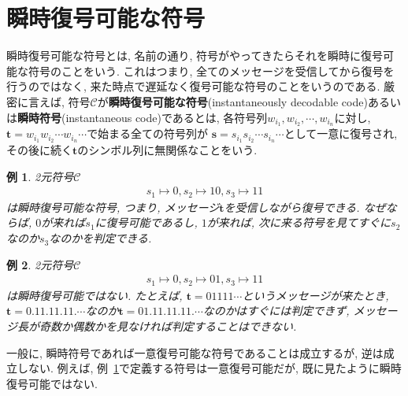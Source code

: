 \documentclass[12pt]{ltjsarticle}
\newcommand*{\exref}[1]{例~\ref{#1}}
\newtheorem{example}{例}
\begin{document}
\section{瞬時復号可能な符号}
瞬時復号可能な符号とは, 名前の通り, 符号がやってきたらそれを瞬時に復号可能な符号のことをいう.
これはつまり, 全てのメッセージを受信してから復号を行うのではなく, 来た時点で遅延なく復号可能な符号のことをいうのである.
厳密に言えば, 符号$\mathcal{C}$が\textbf{瞬時復号可能な符号}(instantaneously decodable code)あるいは\textbf{瞬時符号}(instantaneous code)であるとは,
各符号列$w_{i_1}, w_{i_2}, \cdots, w_{i_n}$に対し,
$\boldsymbol{t} = w_{i_1} w_{i_2} \cdots w_{i_n} \cdots$で始まる全ての符号列が
$\boldsymbol{s} = s_{i_1} s_{i_2} \cdots s_{i_n} \cdots$として一意に復号され,
その後に続く$\boldsymbol{t}$のシンボル列に無関係なことをいう.
\begin{example} \label{ex:not-uniquely}
  2元符号$\mathcal{C}$
  \begin{align*}
    s_1 \mapsto 0, s_2 \mapsto 10, s_3 \mapsto 11
  \end{align*}
  は瞬時復号可能な符号, つまり, メッセージ$\boldsymbol{t}$を受信しながら復号できる.
  なぜならば, $0$が来れば$s_1$に復号可能であるし, $1$が来れば, 次に来る符号を見てすぐに$s_2$なのか$s_3$なのかを判定できる.
\end{example}
\begin{example}
  2元符号$\mathcal{C}$
  \begin{align*}
    s_1 \mapsto 0, s_2 \mapsto 01, s_3 \mapsto 11
  \end{align*}
  は瞬時復号可能ではない.
  たとえば, $\boldsymbol{t} = 01111 \cdots$というメッセージが来たとき,
  $\boldsymbol{t} = 0.11.11.11. \cdots$なのか$\boldsymbol{t} = 01.11.11.11. \cdots$なのかはすぐには判定できず, メッセージ長が奇数か偶数かを見なければ判定することはできない.
\end{example}

一般に, 瞬時符号であれば一意復号可能な符号であることは成立するが, 逆は成立しない.
例えば, \exref{ex:not-uniquely}で定義する符号は一意復号可能だが, 既に見たように瞬時復号可能ではない.
\end{document}
